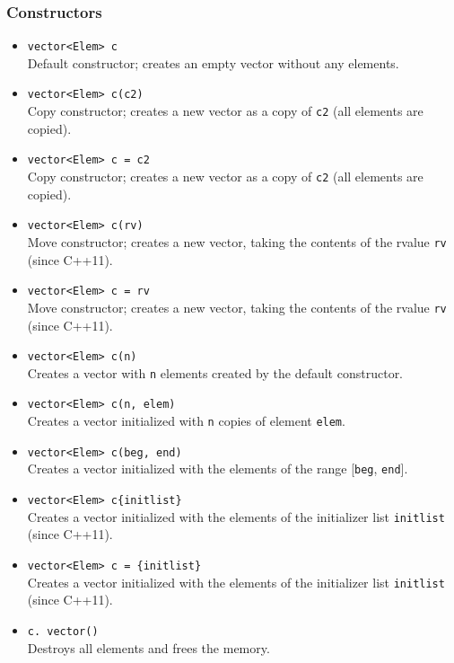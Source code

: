 \documentclass{report}
\begin{document}
\bigbreak \noindent 
\subsubsection{Constructors}
\bigbreak \noindent 
\begin{itemize}
    \item \texttt{vector<Elem> c} \\
          Default constructor; creates an empty vector without any elements.
          
    \item \texttt{vector<Elem> c(c2)} \\
          Copy constructor; creates a new vector as a copy of \texttt{c2} (all elements are copied).
          
    \item \texttt{vector<Elem> c = c2} \\
          Copy constructor; creates a new vector as a copy of \texttt{c2} (all elements are copied).
          
    \item \texttt{vector<Elem> c(rv)} \\
          Move constructor; creates a new vector, taking the contents of the rvalue \texttt{rv} (since C++11).
          
    \item \texttt{vector<Elem> c = rv} \\
          Move constructor; creates a new vector, taking the contents of the rvalue \texttt{rv} (since C++11).
          
    \item \texttt{vector<Elem> c(n)} \\
          Creates a vector with \texttt{n} elements created by the default constructor.
          
    \item \texttt{vector<Elem> c(n, elem)} \\
          Creates a vector initialized with \texttt{n} copies of element \texttt{elem}.
          
    \item \texttt{vector<Elem> c(beg, end)} \\
          Creates a vector initialized with the elements of the range [\texttt{beg}, \texttt{end}].
          
    \item \texttt{vector<Elem> c\{initlist\}} \\
          Creates a vector initialized with the elements of the initializer list \texttt{initlist} (since C++11).
          
    \item \texttt{vector<Elem> c = \{initlist\}} \\
        Creates a vector initialized with the elements of the initializer list \texttt{initlist} (since C++11).

    \item \texttt{c.~vector()} \\
        Destroys all elements and frees the memory.
\end{itemize}
\end{document}
